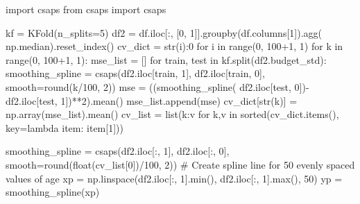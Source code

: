 \begin{python}
import csaps
from csaps import csaps

kf = KFold(n_splits=5)
df2 = df.iloc[:, [0, 1]].groupby(df.columns[1]).agg(
    np.median).reset_index()
cv_dict = {str(i):0 for i in range(0, 100+1, 1)}
for k in range(0, 100+1, 1):
    mse_list = []
    for train, test in kf.split(df2.budget_std):
        smoothing_spline = csaps(df2.iloc[train, 1],
                                 df2.iloc[train, 0],
                                 smooth=round(k/100, 2))
        mse = ((smoothing_spline(
            df2.iloc[test, 0])-df2.iloc[test, 1])**2).mean()
        mse_list.append(mse)
    cv_dict[str(k)] = np.array(mse_list).mean()
cv_list = list({k:v for k,v in sorted(cv_dict.items(), key=lambda item: item[1])})

smoothing_spline = csaps(df2.iloc[:, 1], df2.iloc[:, 0],
                         smooth=round(float(cv_list[0])/100, 2))
# Create spline line for 50 evenly spaced values of age
xp = np.linspace(df2.iloc[:, 1].min(), df2.iloc[:, 1].max(), 50)
yp = smoothing_spline(xp)
\end{python}

